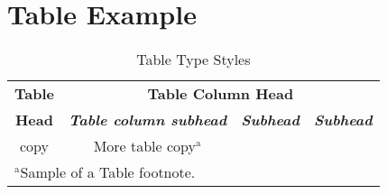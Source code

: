 
\section{Table  Example}

\begin{table}[htbp]
	\begin{center}
		\begin{tabular}{|c|c|c|c|}
			\hline
			\textbf{Table}&\multicolumn{3}{|c|}{\textbf{Table Column Head}} \\
			\cline{2-4} 
			\textbf{Head} & \textbf{\textit{Table column subhead}}& \textbf{\textit{Subhead}}& \textbf{\textit{Subhead}} \\
			\hline
			copy& More table copy$^{\mathrm{a}}$& &  \\
			\hline
			\multicolumn{4}{l}{$^{\mathrm{a}}$Sample of a Table footnote.}
		\end{tabular}
		\caption{Table Type Styles}
		\label{tab1}
	\end{center}
\end{table}